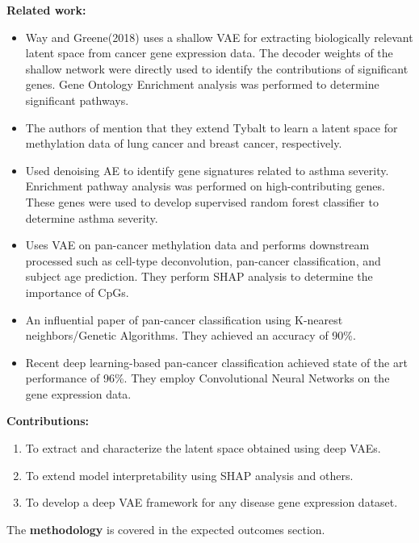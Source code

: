 \documentclass[12pt]{exam}
\begin{document}
\begin{flushleft}\textbf{Related work:}\end{flushleft}
\begin{itemize}
 \item Way and Greene(2018)\textsuperscript{\cite{q5c}} uses a shallow VAE for extracting biologically relevant latent space from cancer gene expression data. The decoder weights of the shallow network were directly used to identify the contributions of significant genes. Gene Ontology Enrichment analysis was performed to determine significant pathways. 
 \item The authors of \cite{Wang2019, Titus2018} mention that they extend Tybalt to learn a latent space for methylation data of lung cancer and breast cancer, respectively. 
 \item \cite{Lou2019} Used denoising AE to identify gene signatures related to asthma severity. Enrichment pathway analysis was performed on high-contributing genes. These genes were used to develop supervised random forest classifier to determine asthma severity.
 \item \cite{Levy2019} Uses VAE on pan-cancer methylation data and performs downstream processed such as cell-type deconvolution, pan-cancer classification, and subject age prediction. They perform SHAP analysis to determine the importance of CpGs.
 \item \cite{Li2017} An influential paper of pan-cancer classification using K-nearest neighbors/Genetic Algorithms. They achieved an accuracy of 90\%.
 \item \cite{Guia2019, Lyu2018} Recent deep learning-based pan-cancer classification achieved state of the art performance of 96\%. They employ Convolutional Neural Networks on the gene expression data.
\end{itemize}

\begin{flushleft}\textbf{Contributions:}\end{flushleft}
\begin{enumerate}
\item To extract and characterize the latent space obtained using deep VAEs.
\item To extend model interpretability using SHAP analysis and others. 
\item To develop a deep VAE framework for any disease gene expression dataset.
\end{enumerate}
The \textbf{methodology} is covered in the expected outcomes section.
\end{document}
